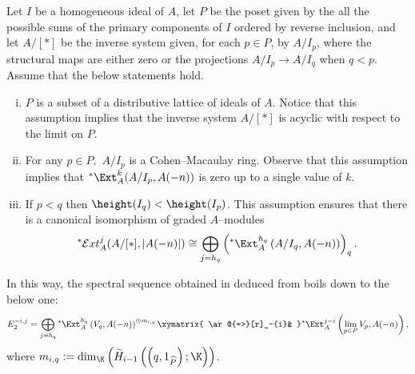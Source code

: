 \documentclass[11pt]{amsart}
\begin{document}
\begin{disc}
Let $I$ be a homogeneous ideal of $A$, let $P$ be the poset given by the all the possible sums of the primary components of $I$ ordered by reverse inclusion, and let $A/[*]$ be the inverse system given, for each $p\in P$, by $A/I_p$, where the structural maps are either zero or the projections $A/I_p\longrightarrow A/I_q$ when $q<p$. Assume that the below statements hold.

\begin{enumerate}[(i)]

\item $P$ is a subset of a distributive lattice of ideals of $A$. Notice that this assumption implies \cite[Proposition 5.1]{AlvarezBoixZarzuelaspectralsequences} that the inverse system $A/[*]$ is acyclic with respect to the limit on $P$.

\item For any $p\in P,$ $A/I_p$ is a Cohen--Macaulay ring. Observe that this assumption implies that $\hbox{}^*\Ext_A^k (A/I_p,A(-n))$ is zero up to a single value of $k$.

\item If $p<q$ then $\height(I_q)<\height(I_p)$. This assumption ensures that there is a canonical isomorphism of graded $A$--modules
\[
\hbox{}^*\mathcal{E}xt_A^j(A/[*],\lvert A(-n)\rvert)\cong\bigoplus_{j=h_q} \left(\hbox{}^*\Ext_A^{h_q} \left(A/I_q,A(-n)\right)\right)_q.
\]

\end{enumerate}
In this way, the spectral sequence obtained in  deduced from  boils down to the below one:
\[
E_2^{-i,j}=\bigoplus_{j=h_q} \hbox{}^*\Ext_A^{h_q} \left(V_q,A(-n)\right)^{\oplus m_{i,q}}\xymatrix{ \ar@{=>}[r]_-{i}& }\hbox{}^*\Ext_A^{j-i} \left(\lim_{p\in P}V_p,A(-n)\right),
\]
where $m_{i,q}:=\dim_{\K} \left(\widetilde{H}_{i-1} \left(\left(q,1_{\widehat{P}}\right);\K\right)\right)$.


\end{disc}
\end{document}
